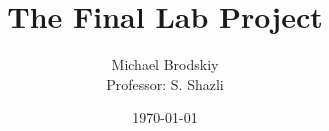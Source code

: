 


\def\code#1{\texttt{#1}}

\pagestyle{fancy}

\title{The Final Lab Project}
\date{\today}
\author{Michael Brodskiy\\ \small Professor: S. Shazli}



\maketitle

\thispagestyle{fancy}

\newpage


